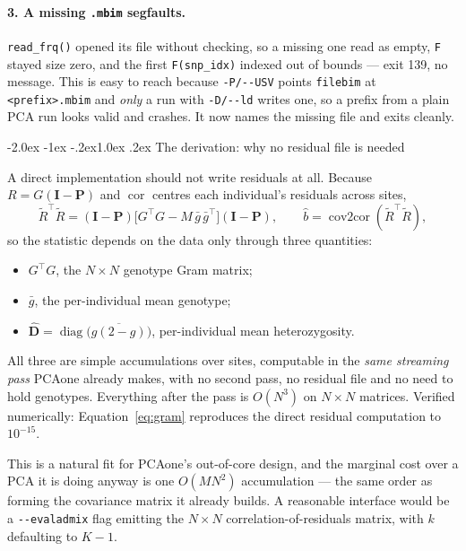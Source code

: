 \documentclass[10pt,a4paper]{article}
\makeatletter
\renewcommand\subsection{\@startsection{subsection}{2}{\z@}%
  {-2.0ex \@plus -1ex \@minus -.2ex}{1.0ex \@plus.2ex}%
  {\normalfont\normalsize\bfseries\color{hdr}}}
\newenvironment{tightitem}{%
  \begin{itemize}\setlength{\itemsep}{1pt}\setlength{\parskip}{0pt}%
  \setlength{\topsep}{3pt}\setlength{\parsep}{0pt}}{\end{itemize}}
\makeatother
\begin{document}
\paragraph{3. A missing \texttt{.mbim} segfaults.} \texttt{read\_frq()} opened its file without checking, so
a missing one read as empty, \texttt{F} stayed size zero, and the first \texttt{F(snp\_idx)} indexed out of
bounds --- exit 139, no message. This is easy to reach because \texttt{-P/-{}-USV} points
\texttt{filebim} at \texttt{<prefix>.mbim} and \emph{only} a run with \texttt{-D/-{}-ld} writes one, so a
prefix from a plain PCA run looks valid and crashes. It now names the missing file and exits cleanly.

\subsection{The derivation: why no residual file is needed}

A direct implementation should not write residuals at all. Because $R=G(\mathbf{I}-\mathbf{P})$ and
$\operatorname{cor}$ centres each individual's residuals across sites,
\begin{equation}
\tilde R^{\!\top}\tilde R=(\mathbf{I}-\mathbf{P})\big[G^{\!\top}G-M\,\bar g\,\bar g^{\!\top}\big](\mathbf{I}-\mathbf{P}),
\qquad \hat b=\operatorname{cov2cor}(\tilde R^{\!\top}\tilde R),
\label{eq:gram}
\end{equation}
so the statistic depends on the data only through three quantities:
\begin{tightitem}
  \item $G^{\!\top}G$, the $N\times N$ genotype Gram matrix;
  \item $\bar g$, the per-individual mean genotype;
  \item $\hat{\mathbf D}=\operatorname{diag}\big(\overline{g(2-g)}\big)$, per-individual mean heterozygosity.
\end{tightitem}
All three are simple accumulations over sites, computable in the \emph{same streaming pass} PCAone already
makes, with no second pass, no residual file and no need to hold genotypes. Everything after the pass is
$O(N^3)$ on $N\times N$ matrices. Verified numerically: Equation~\eqref{eq:gram} reproduces the direct
residual computation to $10^{-15}$.

This is a natural fit for PCAone's out-of-core design, and the marginal cost over a PCA it is doing anyway
is one $O(MN^2)$ accumulation --- the same order as forming the covariance matrix it already builds. A
reasonable interface would be a \texttt{-{}-evaladmix} flag emitting the $N\times N$ correlation-of-residuals
matrix, with $k$ defaulting to $K-1$.
\end{document}
